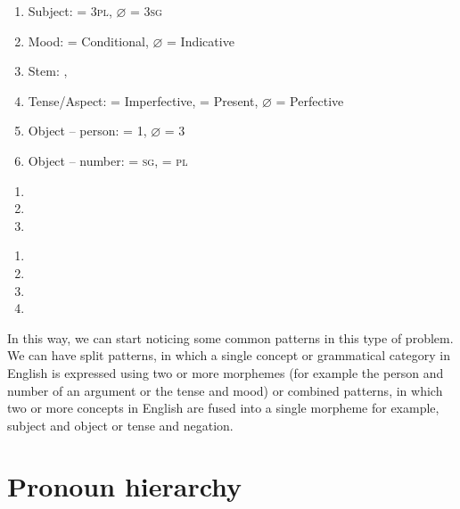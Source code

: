 \begin{refsection}
\begin{mysolution}


\begin{enumerate}
    \item Subject:  = 3\textsc{pl}, $\varnothing$ = 3\textsc{sg}
    \item Mood:  = Conditional, $\varnothing$ = Indicative
    \item Stem: , 
    \item Tense/Aspect:  = Imperfective,  = Present, $\varnothing$ = Perfective
    \item Object – person:  = 1, $\varnothing$ = 3
    \item Object – number:  = \textsc{sg},  = \textsc{pl}
\end{enumerate}

\begin{assgts}
\item
\begin{enumerate}
    \item {}
    \item {}
    \item {}
\end{enumerate}
\item
\begin{enumerate}[resume]
    \item {}
    \item {}
    \item {}
    \item {}
\end{enumerate}
\end{assgts}

 In this way, we can start noticing some common patterns in this type of problem. We can have split patterns, in which a single concept or grammatical category in English is expressed using two or more morphemes (for example the person and number of an argument or the tense and mood) or combined patterns, in which two or more concepts in English are fused into a single morpheme for example, subject and object or tense and negation.
\end{mysolution}

\section{Pronoun hierarchy}


\end{refsection}
